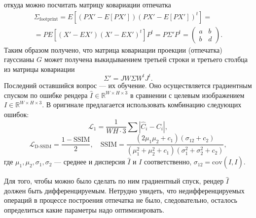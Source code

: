 %
откуда можно посчитать матрицу ковариации отпечатка
%
\begin{multline*}
	\Sigma_\text{footprint} = E \left[
		(PX' - E[PX']) (PX' - E[PX'])^t
	\right] = \\ 
	= P E \left[
		(X' - EX') (X' - EX')^t
	\right] P^t = P \Sigma' P^t = \begin{pmatrix}
		a & b \\
		b & d
	\end{pmatrix}.
\end{multline*}
%
Таким образом получено, что матрица ковариации проекции (отпечатка) гауссианы $G$ может получена выкидываением третьей строки и третьего столбца из матрицы ковариации
%
\begin{equation}
	\Sigma' = JW \Sigma W^t J^t.
	\label{eq:sigma_footprint}
\end{equation}
%
Последний оставшийся вопрос --- их обучение. Оно осуществляется градиентным спуском по ошибке рендера $\hat I \in \mathbb R^{W \times H \times 3}$ в сравнении с целевым изображением $I \in \mathbb R^{W \times H \times 3}$. В оригинале предлагается использовать комбинацию следующих ошибок:
\[
	\mathcal L_1 = \frac{1}{WH \cdot 3} \sum | \hat C_i - C_i |,
\]
\[
	\mathcal L_\text{D-SSIM} = \frac{1 - \mathrm{SSIM}}{2}, \quad \mathrm{SSIM} = \frac{
		(2 \mu_1 \mu_2 + c_1) (\sigma_{12} + c_2)  
	}{
		(\mu_1^2 + \mu_2^2 + c_1) (\sigma_1^2 + \sigma_2^2 + c_2)
	},
\]
%
где $\mu_1, \mu_2, \sigma_1, \sigma_2$ --- среднее и дисперсия $\hat I$ и $I$ соответственно, $\sigma_{12}=\mathrm{cov} (\hat I, I)$.

Для того, чтобы можно было сделать по ним градиентный спуск, рендер $\hat I$ должен быть дифференцируемым. Нетрудно увидеть, что недифференцируемых операций в процессе построения отпечатка не было, следовательно, осталось определиться какие параметры надо оптимизировать.

